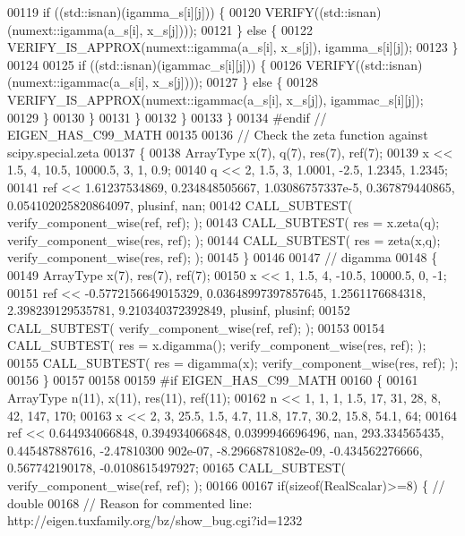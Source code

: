 \begin{DoxyCode}
00119           \textcolor{keywordflow}{if} ((std::isnan)(igamma\_s[i][j])) \{
00120             VERIFY((std::isnan)(numext::igamma(a\_s[i], x\_s[j])));
00121           \} \textcolor{keywordflow}{else} \{
00122             VERIFY\_IS\_APPROX(numext::igamma(a\_s[i], x\_s[j]), igamma\_s[i][j]);
00123           \}
00124 
00125           \textcolor{keywordflow}{if} ((std::isnan)(igammac\_s[i][j])) \{
00126             VERIFY((std::isnan)(numext::igammac(a\_s[i], x\_s[j])));
00127           \} \textcolor{keywordflow}{else} \{
00128             VERIFY\_IS\_APPROX(numext::igammac(a\_s[i], x\_s[j]), igammac\_s[i][j]);
00129           \}
00130         \}
00131       \}
00132     \}
00133   \}
00134 \textcolor{preprocessor}{#endif  // EIGEN\_HAS\_C99\_MATH}
00135 
00136   \textcolor{comment}{// Check the zeta function against scipy.special.zeta}
00137   \{
00138     ArrayType x(7), q(7), res(7), ref(7);
00139     x << 1.5,   4, 10.5, 10000.5,    3, 1,        0.9;
00140     q << 2,   1.5,    3,  1.0001, -2.5, 1.2345, 1.2345;
00141     ref << 1.61237534869, 0.234848505667, 1.03086757337e-5, 0.367879440865, 0.054102025820864097, plusinf, 
      nan;
00142     CALL\_SUBTEST( verify\_component\_wise(ref, ref); );
00143     CALL\_SUBTEST( res = x.zeta(q); verify\_component\_wise(res, ref); );
00144     CALL\_SUBTEST( res = zeta(x,q); verify\_component\_wise(res, ref); );
00145   \}
00146 
00147   \textcolor{comment}{// digamma}
00148   \{
00149     ArrayType x(7), res(7), ref(7);
00150     x << 1, 1.5, 4, -10.5, 10000.5, 0, -1;
00151     ref << -0.5772156649015329, 0.03648997397857645, 1.2561176684318, 2.398239129535781, 9.210340372392849,
       plusinf, plusinf;
00152     CALL\_SUBTEST( verify\_component\_wise(ref, ref); );
00153 
00154     CALL\_SUBTEST( res = x.digamma(); verify\_component\_wise(res, ref); );
00155     CALL\_SUBTEST( res = digamma(x);  verify\_component\_wise(res, ref); );
00156   \}
00157 
00158 
00159 \textcolor{preprocessor}{#if EIGEN\_HAS\_C99\_MATH}
00160   \{
00161     ArrayType n(11), x(11), res(11), ref(11);
00162     n << 1, 1,    1, 1.5,   17,   31,   28,    8, 42, 147, 170;
00163     x << 2, 3, 25.5, 1.5,  4.7, 11.8, 17.7, 30.2, 15.8, 54.1, 64;
00164     ref << 0.644934066848, 0.394934066848, 0.0399946696496, nan, 293.334565435, 0.445487887616, -2.47810300
      902e-07, -8.29668781082e-09, -0.434562276666, 0.567742190178, -0.0108615497927;
00165     CALL\_SUBTEST( verify\_component\_wise(ref, ref); );
00166 
00167     \textcolor{keywordflow}{if}(\textcolor{keyword}{sizeof}(RealScalar)>=8) \{  \textcolor{comment}{// double}
00168       \textcolor{comment}{// Reason for commented line: http://eigen.tuxfamily.org/bz/show\_bug.cgi?id=1232}

\end{DoxyCode}
